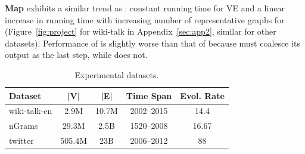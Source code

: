 {\bf Map} exhibits a similar trend
as : constant running time for VE and a linear increase
in running time with increasing number of representative graphs for
\sg (Figure~\ref{fig:project} for wiki-talk in
Appendix~\ref{sec:app2}, similar for other datasets).  Performance of
 is slightly worse than that of  because
 must coalesce its output as the last step, while
 does not.

\begin{table}
\caption{Experimental datasets.}
\vspace{-0.1in}
\small
\begin{tabular}{l | c | c | c | c }
\hline
\multicolumn{1}{l|}{\bfseries Dataset} & \multicolumn{1}{c|}{\bfseries |V|} & \multicolumn{1}{c|}{\bfseries |E|} & \multicolumn{1}{c|}{\bfseries Time Span} & \multicolumn{1}{c}{\bfseries Evol. Rate} \\ \hline
wiki-talk-en & 2.9M & 10.7M & 2002--2015 & 14.4 \\ \hline
nGrams & 29.3M & 2.5B & 1520--2008 & 16.67 \\ \hline
twitter & 505.4M & 23B & 2006--2012 & 88 \\ \hline
\end{tabular}
\vspace{-0.1cm}
\label{tab:datasets}
\end{table}

